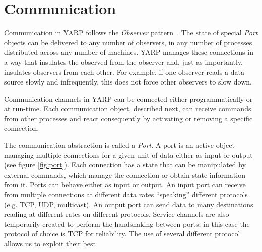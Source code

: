 \section{Communication}
\label{sec:communication}

%
Communication in YARP follows the {\em Observer} pattern~\cite{gamma95design}.  The state
of special {\it Port} objects can be delivered to any number of
observers, in any number of processes distributed across any number of
machines.  YARP manages these connections in a way that insulates
the observed from the observer and, just as importantly, insulates
observers from each other.  For example,
if one observer reads a data source slowly and infrequently, this
does not force other observers to slow down.

Communication channels in YARP can be connected either programmatically or at run-time.
Each communication object, described next, can receive commands from other processes and 
react consequently by activating or removing a specific connection.

The communication abstraction is called a {\em Port}. A port is an active object 
managing multiple connections for a given unit of data either as input or output
(see figure \ref{fig:port}). Each connection has a state that can be manipulated
by external commands, which manage the connection or obtain state information from it. 
Ports can behave either as input or output.
An input port can receive from multiple connections at different data rates 
``speaking'' different protocols (e.g. TCP, UDP, multicast). An output port can 
send data to many destinations reading at different rates on different protocols.
Service channels are also temporarily created to perform the handshaking 
between ports; in this case the protocol of choice is TCP for reliability. 
The use of several different protocol allows us to exploit their best

